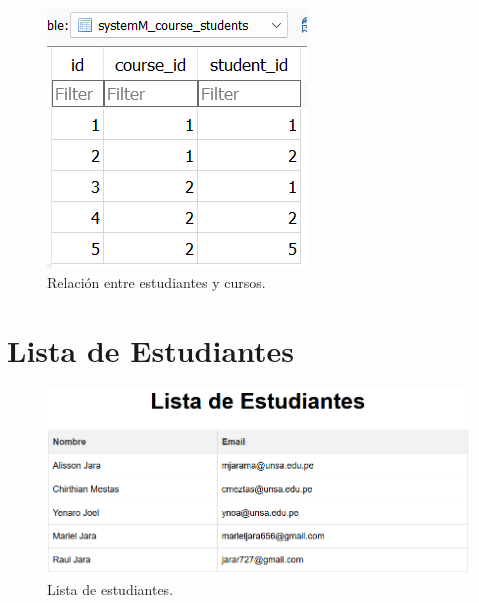 \documentclass{article}
\begin{document}
\begin{figure}[H]
\begin{minipage}{0.3\textwidth}
	\end{minipage}
	\begin{minipage}{0.3\textwidth}
		\centering
		\includegraphics[width=\linewidth,keepaspectratio]{img/relation.png}
		\caption{Relación entre estudiantes y cursos.}
	\end{minipage}
\end{figure}

\section{Lista de Estudiantes}
\begin{figure}[H]
	\centering
	\begin{minipage}{0.6\textwidth}
		\centering
		\includegraphics[width=\linewidth,keepaspectratio]{img/listStudents.png}
		\caption{Lista de estudiantes.}
	\end{minipage}
\end{figure}
\end{document}
